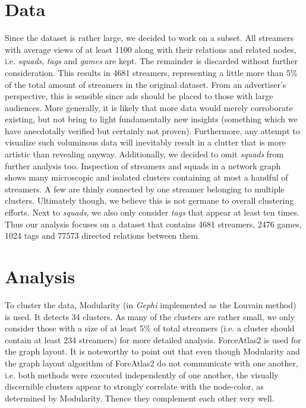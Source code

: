 \documentclass[11pt, oneside]{article}   	%
\begin{document}
\section{Data}
Since the dataset is rather large, we decided to work on a subset. All streamers with average views of at least 1100 along with their relations and related nodes, i.e. \textit{squads}, \textit{tags} and \textit{games} are kept. The remainder is discarded without further consideration. This results in 4681 streamers, representing a little more than 5\% of the total amount of streamers in the original dataset. From an advertiser's perspective, this is sensible since ads should be placed to those with large audiences. More generally, it is likely that more data would merely corroborate existing, but not bring to light fundamentally new insights (something which we have anecdotally verified but certainly not proven). Furthermore, any attempt to visualize such voluminous data will inevitably result in a clutter that is more artistic than revealing anyway.
\newline
Additionally, we decided to omit \textit{squads} from further analysis too. Inspection of streamers and squads in a network graph shows many microscopic and isolated clusters containing at most a handful of streamers. A few are thinly connected by one streamer belonging to multiple clusters.
Ultimately though, we believe this is not germane to overall clustering efforts.
Next to \textit{squads}, we also only consider \textit{tags} that appear at least ten times.
\newline
Thus our analysis focuses on a dataset that contains 4681 streamers, 2476 games, 1024 tags and 77573 directed relations between them.

\section{Analysis}

To cluster the data, Modularity (in \textit{Gephi} implemented as the Louvain method) is used. It detects 34 clusters. As many of the clusters are rather small, we only consider those with a size of at least 5\% of total streamers (i.e. a cluster should contain at least 234 streamers) for more detailed analysis.
ForceAtlas2 is used for the graph layout.
\newline
It is noteworthy to point out that even though Modularity and the graph layout algorithm of ForeAtlas2 do not communicate with one another, i.e. both methods were executed independently of one another, the visually discernible clusters appear to strongly correlate with the node-color, as determined by Modularity. Thence they complement each other very well.
\end{document}
